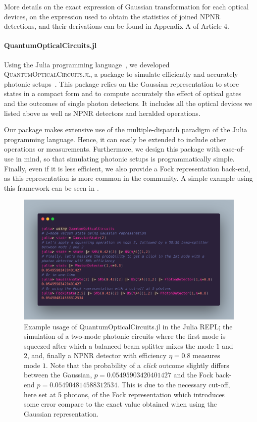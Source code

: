 More details on the exact expression of Gaussian transformation for each optical devices, on the expression used to obtain the statistics of joined NPNR detections, and their derivations can be found in Appendix A of Article 4.

\paragraph{QuantumOpticalCircuits.jl}

Using the Julia programming language~\cite{Bezanson2017}, we developed \textsc{QuantumOpticalCircuits.jl}, a package to simulate efficiently and accurately photonic setups~\cite{Valcarce2021}.
This package relies on the Gaussian representation to store states in a compact form and to compute accurately the effect of optical gates and the outcomes of single photon detectors.
It includes all the optical devices we listed above as well as NPNR detectors and heralded operations.

Our package makes extensive use of the multiple-dispatch paradigm of the Julia programming language.
Hence, it can easily be extended to include other operations or measurements.
Furthermore, we design this package with ease-of-use in mind, so that simulating photonic setups is programmatically simple.
Finally, even if it is less efficient, we also provide a Fock representation back-end, as this representation is more common in the community.
A simple example using this framework can be seen in .

\begin{figure}
	\begin{center}
		\includegraphics[width=1\textwidth]{chapters/deviceindependent/img/quantumopticalcircuits.png}
	\end{center}
\caption{Example usage of QuantumOpticalCircuits.jl in the Julia REPL; the simulation of a two-mode photonic circuits where the first mode is squeezed after which a balanced beam splitter mixes the mode $1$ and $2$, and, finally a NPNR detector with efficiency $\eta=0.8$ measures mode $1$. Note that the probability of a \textit{click} outcome slightly differs between the Gaussian, $p=0.05495903420401427$ and the Fock back-end $p=0.054904814588312534$. This is due to the necessary cut-off, here set at 5 photons, of the Fock
representation which introduces some error compare to the exact value obtained when using the Gaussian representation.}
	\label{fig:QOC.jl}
\end{figure}


